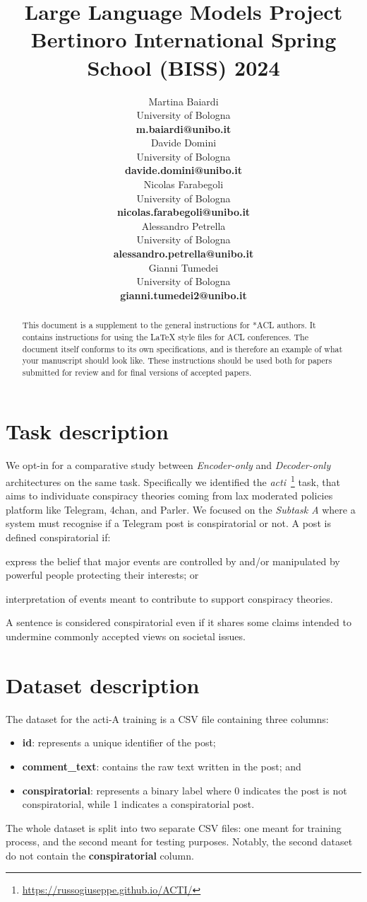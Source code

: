 \documentclass[11pt]{article}
\title{Large Language Models Project \\
Bertinoro International Spring School (BISS) 2024}
\author{
  Martina Baiardi \\
  University of Bologna \\
  {\bf m.baiardi@unibo.it} \\ \And
  Davide Domini \\
  University of Bologna \\
  {\bf davide.domini@unibo.it} \\  \And
  Nicolas Farabegoli \\
  University of Bologna \\
  {\bf nicolas.farabegoli@unibo.it} \\  \AND 
  Alessandro Petrella\\
  University of Bologna \\ 
  {\bf alessandro.petrella@unibo.it} \\ \And 
  Gianni Tumedei \\
  University of Bologna \\
  {\bf gianni.tumedei2@unibo.it}
}
\begin{document}
\maketitle
\begin{abstract}
This document is a supplement to the general instructions for *ACL authors. It contains instructions for using the \LaTeX{} style files for ACL conferences.
The document itself conforms to its own specifications, and is therefore an example of what your manuscript should look like.
These instructions should be used both for papers submitted for review and for final versions of accepted papers.
\end{abstract}

\section{Task description}\label{sec:task-description}
We opt-in for a comparative study between \emph{Encoder-only} and \emph{Decoder-only} architectures on the same task.
%
Specifically we identified the \emph{\ac{acti}}~\footnote{\url{https://russogiuseppe.github.io/ACTI/}} task,
that aims to individuate conspiracy theories coming from lax moderated policies platform like Telegram, 4chan, and Parler.
%
We focused on the \emph{Subtask A} where a system must recognise if a Telegram post is conspiratorial or not.
%
A post is defined conspiratorial if:
\begin{enumerate*}[label=(\roman{*})]
  \item express the belief that major events are controlled by and/or manipulated by powerful people protecting their interests; or
  \item interpretation of events meant to contribute to support conspiracy theories.
\end{enumerate*}
A sentence is considered conspiratorial even if it shares some claims intended to undermine commonly accepted views on societal issues.

\section{Dataset description}\label{sec:dataset-description}
The dataset for the \ac{acti}-A training is a CSV file containing three columns:
\begin{itemize}
  \item \textbf{id}: represents a unique identifier of the post;
  \item \textbf{comment\_text}: contains the raw text written in the post; and
  \item \textbf{conspiratorial}: represents a binary label where 0 indicates the post is not conspiratorial,
    while 1 indicates a conspiratorial post.
\end{itemize}
The whole dataset is split into two separate CSV files: one meant for training process,
and the second meant for testing purposes.
%
Notably,
the second dataset do not contain the \textbf{conspiratorial} column.
\end{document}
